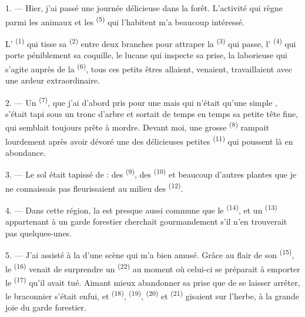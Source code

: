 \VUsaut{3.0mm}
\VUsaut{3.0mm}

\VUsaut{3.0mm}

1. --- Hier, j'ai passé une journée délicieuse dans la forêt. L'activité qui
règne parmi les animaux et les  \textsuperscript{(5)} qui
l'habitent m'a beaucoup intéressé.

L' \textsuperscript{(1)} qui tisse sa 
\textsuperscript{(2)} entre deux branches pour attraper la 
\textsuperscript{(3)} qui passe, l' \textsuperscript{(4)} qui
porte péniblement sa coquille, le lucane qui inspecte sa prise, la
 laborieuse qui s'agite auprès de la 
\textsuperscript{(6)}, tous ces petits êtres allaient, venaient, travaillaient
avec une ardeur extraordinaire.

2. --- Un  \textsuperscript{(7)}, que j'ai d'abord pris pour une
 mais qui n'était qu'une simple , s'était tapi
sous un tronc d'arbre et sortait de temps en temps sa petite tête fine, qui
semblait toujours prête à mordre. Devant moi, une grosse 
\textsuperscript{(8)} rampait lourdement après avoir dévoré une des délicieuses
petites  \textsuperscript{(11)} qui poussent là en abondance.

3. --- Le sol était tapissé de  : des
 \textsuperscript{(9)}, des 
\textsuperscript{(10)} et beaucoup d'autres plantes que je ne connaissais pas
fleurissaient au milieu des  \textsuperscript{(12)}.

4. --- Dans cette région, la  est presque aussi commune que le
 \textsuperscript{(14)}, et un 
\textsuperscript{(13)} appartenant à un garde forestier cherchait
gourmandement s'il n'en trouverait pas quelques-unes.

\VUsaut{3.0mm}
\VUsaut{3.0mm}

5. --- J'ai assisté à la  d'une scène qui m'a bien amusé. Grâce au
flair de son  \textsuperscript{(15)}, le  \textsuperscript{(16)} venait de surprendre un 
\textsuperscript{(22)} au moment où celui-ci se préparait à emporter le
 \textsuperscript{(17)} qu'il avait tué. Aimant mieux abandonner
sa prise que de se laisser arrêter, le braconnier s'était enfui, et
 \textsuperscript{(18)},  \textsuperscript{(19)},
 \textsuperscript{(20)} et 
\textsuperscript{(21)} gisaient sur l'herbe, à la grande joie du garde
forestier.

